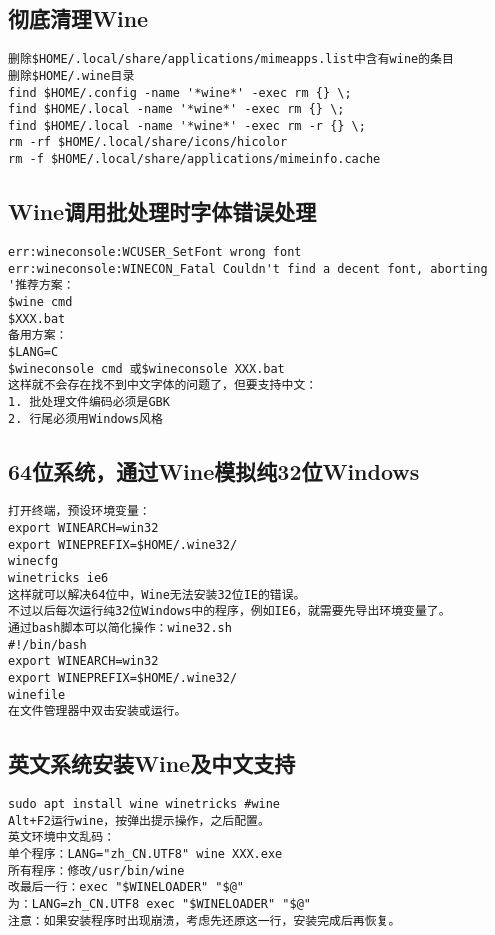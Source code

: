 \documentclass[a4paper,fontset=fandol,zihao=-4,linespread=1.2,oneside]{ctexbook}
\begin{document}
\subsection{彻底清理Wine}
\begin{lstlisting}
删除$HOME/.local/share/applications/mimeapps.list中含有wine的条目
删除$HOME/.wine目录
find $HOME/.config -name '*wine*' -exec rm {} \;
find $HOME/.local -name '*wine*' -exec rm {} \;
find $HOME/.local -name '*wine*' -exec rm -r {} \;
rm -rf $HOME/.local/share/icons/hicolor
rm -f $HOME/.local/share/applications/mimeinfo.cache
\end{lstlisting}

\subsection{Wine调用批处理时字体错误处理}
\begin{lstlisting}
err:wineconsole:WCUSER_SetFont wrong font
err:wineconsole:WINECON_Fatal Couldn't find a decent font, aborting
'推荐方案：
$wine cmd
$XXX.bat
备用方案：
$LANG=C
$wineconsole cmd 或$wineconsole XXX.bat
这样就不会存在找不到中文字体的问题了，但要支持中文：
1. 批处理文件编码必须是GBK
2. 行尾必须用Windows风格
\end{lstlisting}

\subsection{64位系统，通过Wine模拟纯32位Windows}
\begin{lstlisting}
打开终端，预设环境变量：
export WINEARCH=win32
export WINEPREFIX=$HOME/.wine32/
winecfg
winetricks ie6
这样就可以解决64位中，Wine无法安装32位IE的错误。
不过以后每次运行纯32位Windows中的程序，例如IE6，就需要先导出环境变量了。
通过bash脚本可以简化操作：wine32.sh
#!/bin/bash
export WINEARCH=win32
export WINEPREFIX=$HOME/.wine32/
winefile
在文件管理器中双击安装或运行。
\end{lstlisting}

\subsection{英文系统安装Wine及中文支持}
\begin{lstlisting}
sudo apt install wine winetricks #wine
Alt+F2运行wine，按弹出提示操作，之后配置。
英文环境中文乱码：
单个程序：LANG="zh_CN.UTF8" wine XXX.exe
所有程序：修改/usr/bin/wine
改最后一行：exec "$WINELOADER" "$@"
为：LANG=zh_CN.UTF8 exec "$WINELOADER" "$@"
注意：如果安装程序时出现崩溃，考虑先还原这一行，安装完成后再恢复。
\end{lstlisting}
\end{document}
